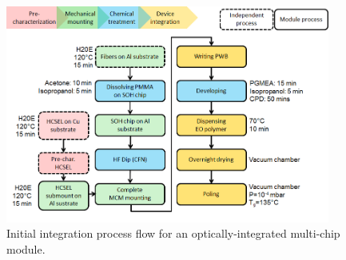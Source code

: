 \begin{figure}[!ht]
  \centering
  \includegraphics[width=0.95\textwidth]{visio/ProcessFlow_Otorres}
  \caption{Initial integration process flow for an optically-integrated multi-chip module.}
  \label{fig:PF_O}
\end{figure}

